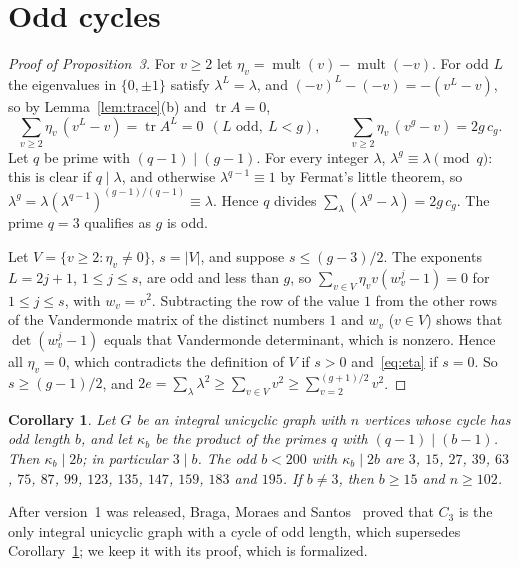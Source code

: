 \documentclass[11pt]{article}
\newtheorem{corollary}[lemma]{Corollary}
\theoremstyle{definition}
\theoremstyle{remark}
\DeclareMathOperator{\mult}{mult}
\DeclareMathOperator{\tr}{tr}
\begin{document}
\section{Odd cycles}\label{sec:odd}

\begin{proof}[Proof of Proposition~3]
For $v\ge2$ let $\eta_v=\mult(v)-\mult(-v)$. For odd $L$ the eigenvalues in
$\{0,\pm1\}$ satisfy $\lambda^L=\lambda$, and $(-v)^L-(-v)=-(v^L-v)$, so by
Lemma~\ref{lem:trace}(b) and $\tr A=0$,
\begin{equation}\label{eq:eta}
 \sum_{v\ge2}\eta_v\,(v^L-v)=\tr A^L=0\ \ (L\text{ odd},\ L<g),\qquad
 \sum_{v\ge2}\eta_v\,(v^g-v)=2g\,c_g.
\end{equation}
Let $q$ be prime with $(q-1)\mid(g-1)$. For every integer $\lambda$,
$\lambda^g\equiv\lambda\pmod q$: this is clear if $q\mid\lambda$, and otherwise
$\lambda^{q-1}\equiv1$ by Fermat's little theorem, so
$\lambda^g=\lambda(\lambda^{q-1})^{(g-1)/(q-1)}\equiv\lambda$. Hence $q$ divides
$\sum_\lambda(\lambda^g-\lambda)=2g\,c_g$. The prime $q=3$ qualifies as $g$ is
odd.

Let $V=\{v\ge2:\eta_v\ne0\}$, $s=|V|$, and suppose $s\le(g-3)/2$. The
exponents $L=2j+1$, $1\le j\le s$, are odd and less than $g$, so
$\sum_{v\in V}\eta_vv(w_v^j-1)=0$ for $1\le j\le s$, with $w_v=v^2$. Subtracting
the row of the value $1$ from the other rows of the Vandermonde matrix of the
distinct numbers $1$ and $w_v$ ($v\in V$) shows that $\det(w_v^j-1)$ equals
that Vandermonde determinant, which is nonzero. Hence all $\eta_v=0$, which
contradicts the definition of $V$ if $s>0$ and~\eqref{eq:eta} if $s=0$. So
$s\ge(g-1)/2$, and $2e=\sum_\lambda\lambda^2\ge\sum_{v\in V}v^2\ge
\sum_{v=2}^{(g+1)/2}v^2$.
\end{proof}

\begin{corollary}\label{cor:odd}
Let $G$ be an integral unicyclic graph with $n$ vertices whose cycle has odd
length $b$, and let $\kappa_b$ be the product of the primes $q$ with
$(q-1)\mid(b-1)$. Then $\kappa_b\mid2b$; in particular $3\mid b$. The odd
$b<200$ with $\kappa_b\mid2b$ are $3$, $15$, $27$, $39$, $63$, $75$, $87$,
$99$, $123$, $135$, $147$, $159$, $183$ and $195$. If $b\ne3$, then $b\ge15$ and
$n\ge102$.
\end{corollary}

After version~1 was released, Braga, Moraes and Santos~\cite{bms2} proved
that $C_3$ is the only integral unicyclic graph with a cycle of odd length,
which supersedes Corollary~\ref{cor:odd}; we keep it with its proof, which is
formalized.
\end{document}
